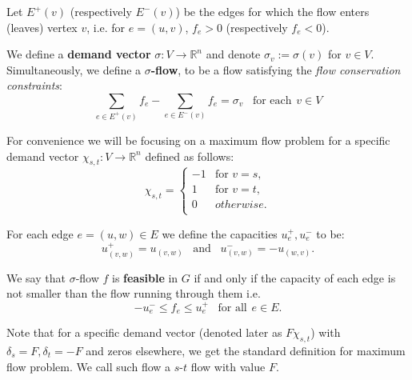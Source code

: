 \begin{definition}
Let $E^+(v)$ (respectively $E^-(v)$) be the edges for which the flow enters (leaves) vertex $v$, i.e. for $e=(u,v)$, $f_e > 0$ (respectively $f_e < 0$).
\end{definition}

\begin{definition}
We define a \textbf{demand vector} $\sigma: V \rightarrow \mathbb{R}^n$ and denote $\sigma_v := \sigma(v)$ for $v \in V$. Simultaneously, we define a $\sigma$\textbf{-flow}, to be a flow satisfying the \textit{flow conservation constraints}:
\begin{equation}
\label{flow_conservation}
\sum_{e \in E^+(v)} f_e - \sum_{e \in E^-(v)} f_e = \sigma_v \hspace{10pt} \text{for each} \hspace{5pt} v \in V
\end{equation}
\end{definition}

For convenience we will be focusing on a maximum flow problem for a specific demand vector $\chi_{s,t}: V \rightarrow \mathbb{R}^n$ defined as follows:
\[ \chi_{s,t} = \begin{cases}
    -1 & \text{for } v = s, \\
    1 & \text{for } v = t, \\
    0 & otherwise.  \\
  \end{cases} \]

\begin{definition}
For each edge $e=(u,w)\in E$ we define the capacities $u^+_e, u^-_e$ to be:
\[ u^+_{(v,w)} = u_{(v,w)} \hspace{10pt} \text{and} \hspace{10pt} u^-_{(v,w)} = -u_{(w,v)}. \]
\end{definition}

\begin{definition}
We say that $\sigma$-flow $f$ is \textbf{feasible} in $G$ if and only if the capacity of each edge is not smaller than the flow running through them i.e.
\[ -u^-_e \le f_e \le u^+_e \hspace{10pt} \text{for all} \hspace{5pt} e\in E.\]
\end{definition}

Note that for a specific demand vector (denoted later as $F\chi_{s,t}$) with $\delta_s=F, \delta_t=-F$ and zeros elsewhere, we get the standard definition for maximum flow problem.
We call such flow a $s$-$t$ flow with value $F$.


